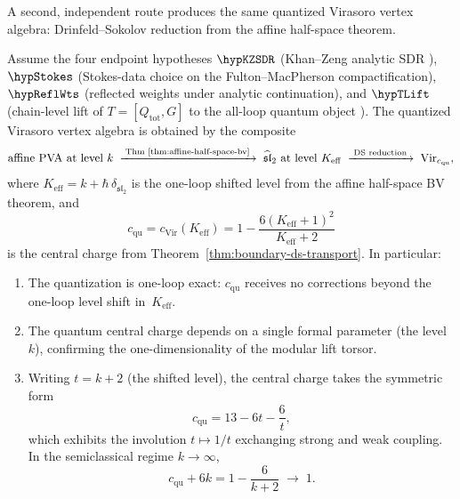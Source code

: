 A second, independent route produces the same quantized Virasoro vertex
algebra: Drinfeld--Sokolov reduction from the affine half-space theorem.

\begin{theorem}
\label{thm:virasoro-quantization-ds}
Assume the four endpoint hypotheses
$\hypKZSDR$ (Khan--Zeng analytic SDR \cite{KZ25}),
$\hypStokes$ (Stokes-data choice on the Fulton--MacPherson
compactification),
$\hypReflWts$ (reflected weights under analytic continuation),
and $\hypTLift$ (chain-level lift of $T = [Q_{\mathrm{tot}}, G]$ to
the all-loop quantum object \cite{Costello2011Renorm,CG17,LurieHA}).
The quantized Virasoro vertex algebra is obtained by the composite
\[
\text{affine PVA at level }k
\;\xrightarrow{\;\text{Thm~\ref{thm:affine-half-space-bv}}\;}
\;\widehat{\mathfrak{sl}}_2\text{ at level }K_{\mathrm{eff}}
\;\xrightarrow{\;\text{DS reduction}\;}
\;\mathrm{Vir}_{c_{\mathrm{qu}}},
\]
where $K_{\mathrm{eff}} = k + \hbar\,\delta_{\mathfrak{sl}_2}$ is the
one-loop shifted level from the affine half-space BV theorem, and
\begin{equation}\label{eq:virasoro-central-charge-ds}
c_{\mathrm{qu}} = c_{\mathrm{Vir}}(K_{\mathrm{eff}})
= 1 - \frac{6(K_{\mathrm{eff}}+1)^2}{K_{\mathrm{eff}}+2}
\end{equation}
is the central charge from
Theorem~\textup{\ref{thm:boundary-ds-transport}}.
In particular:
\begin{enumerate}[leftmargin=2.4em]
\item The quantization is one-loop exact: $c_{\mathrm{qu}}$ receives
no corrections beyond the one-loop level shift in~$K_{\mathrm{eff}}$.
\item The quantum central charge depends on a single formal parameter
(the level~$k$), confirming the one-dimensionality of the modular lift
torsor.
\item Writing $t = k+2$ (the shifted level), the central charge
takes the symmetric form
\[
c_{\mathrm{qu}} = 13 - 6t - \frac{6}{t},
\]
which exhibits the involution $t\mapsto 1/t$ exchanging strong and
weak coupling. In the semiclassical regime $k\to\infty$,
\[
c_{\mathrm{qu}} + 6k = 1 - \frac{6}{k+2} \;\to\; 1.
\]
\end{enumerate}
\end{theorem}

